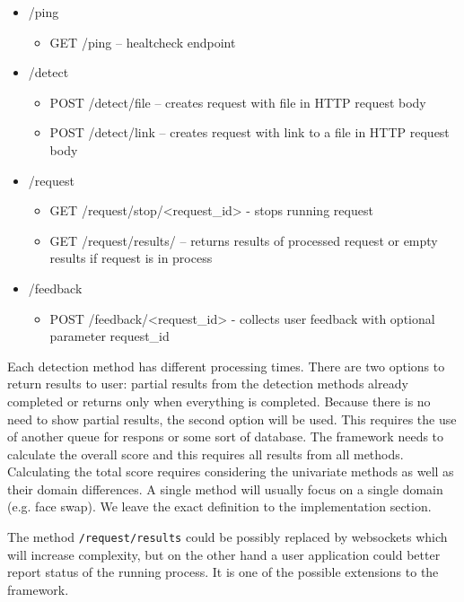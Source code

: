 \begin{itemize}
\item /ping
    \begin{itemize}
    \item GET /ping – healtcheck endpoint
    \end{itemize}
\item /detect
    \begin{itemize}
    \item POST /detect/file – creates request with file in HTTP request body
    \item POST /detect/link – creates request with link to a file in HTTP request body
    \end{itemize}
\newpage
\item /request
    \begin{itemize}
    \item GET /request/stop/<request\_id> - stops running request
    \item GET /request/results/ – returns results of processed request or empty results if request is in process
    \end{itemize}
\item /feedback
    \begin{itemize}
    \item POST /feedback/<request\_id> - collects user feedback with optional parameter request\_id
    \end{itemize}
\end{itemize}

Each detection method has different processing times. There are two options to return results to user: partial results from the detection methods already completed or returns only when everything is completed. Because there is no need to show partial results, the second option will be used. This requires the use of another queue for respons or some sort of database. The framework needs to calculate the overall score and this requires all results from all methods. Calculating the total score requires considering the univariate methods as well as their domain differences. A single method will usually focus on a single domain (e.g. face swap). We leave the exact definition to the implementation section.

The method \texttt{/request/results} could be possibly replaced by websockets which will increase complexity, but on the other hand a user application could better report status of the running process. It is one of the possible extensions to the framework.

